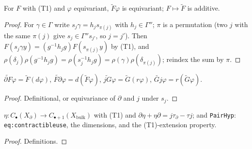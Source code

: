 \begin{lemma}\label{lem:cosettransport}
  \leanok
  For $F$ with (T1) and $\varphi$ equivariant, $\widetilde F\varphi$ is equivariant; $F\mapsto\widetilde F$ is additive.
\end{lemma}
\begin{proof}
  \leanok
  For $\gamma\in\Gamma$ write $s_j\gamma=h_js_{\pi(j)}$ with $h_j\in\Gamma''$; $\pi$ is a permutation (two $j$ with the same
  $\pi(j)$ give $s_j\in\Gamma''s_{j'}$, so $j=j'$). Then $F(s_j\gamma y)=(g^{-1}h_jg)F(s_{\pi(j)}y)$ by (T1), and
  $\rho(\delta_j)\rho(g^{-1}h_jg)=\rho(s_j^{-1}h_jg)=\rho(\gamma)\rho(\delta_{\pi(j)})$; reindex the sum by $\pi$.
\end{proof}

\begin{lemma}\label{lem:cosettransport-24}
  \leanok
  $\widetilde{\partial F}\varphi=\widetilde F(d\varphi)$, $\widetilde{F\partial}\varphi=d(\widetilde F\varphi)$,
  $\widetilde{jG}\varphi=\widetilde G(r\varphi)$, $\widetilde{Gj}\varphi=r(\widetilde G\varphi)$.
\end{lemma}
\begin{proof}
  \leanok
  Definitional, or equivariance of $\partial$ and $j$ under $s_j$.
\end{proof}

\begin{definition}\label{def:pairhomotopy}
  \leanok
  $\eta\colon C_\bullet(X_\partial)\to C_{\bullet+1}(X_{\mathrm{bulk}})$ with (T1) and $\partial\eta+\eta\partial=j\tau_\partial-\tau j$; and
  \texttt{PairHyp}: \texttt{eq:contractibleuse}, the dimensions, and the (T1)-extension property.
\end{definition}
\begin{proof}
  \leanok
  Definitions.
\end{proof}

